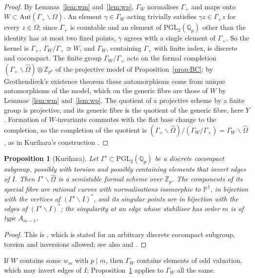 \documentclass[11pt]{amsart}
\theoremstyle{plain}
\newtheorem{proposition}[theorem]{Proposition}
\theoremstyle{remark}
\newcommand{\Z}{\mathbb{Z}}
\newcommand{\Qp}{\mathbb{Q}_p}
\newcommand{\Ohat}{\widehat{\Omega}}
\newcommand{\PGL}{\mathrm{PGL}}
\newcommand{\Aut}{\mathrm{Aut}}
\begin{document}
\begin{proof}
By Lemmas~\ref{lem:wm} and~\ref{lem:wp}, $\Gamma_W$ normalises $\Gamma_+$ and maps onto $W \subset \Aut(\Gamma_+\backslash\Omega)$. An element $\gamma \in \Gamma_W$ acting trivially satisfies $\gamma z \in \Gamma_+ z$ for every $z \in \Omega$; since $\Gamma_+$ is countable and an element of $\PGL_2(\Qp)$ other than the identity has at most two fixed points, $\gamma$ agrees with a single element of $\Gamma_+$. So the kernel is $\Gamma_+$, $\Gamma_W/\Gamma_+ \cong W$, and $\Gamma_W$, containing $\Gamma_+$ with finite index, is discrete and cocompact. The finite group $\Gamma_W/\Gamma_+$ acts on the formal completion $(\Gamma_+\backslash\Ohat) \otimes \Z_{p^2}$ of the projective model of Proposition~\ref{prop:BC}; by Grothendieck's existence theorem \cite[III, 5.4.1]{EGA} these automorphisms come from unique automorphisms of the model, which on the generic fibre are those of $W$ by Lemmas~\ref{lem:wm} and~\ref{lem:wp}. The quotient of a projective scheme by a finite group is projective, and its generic fibre is the quotient of the generic fibre, here $Y$. Formation of $W$-invariants commutes with the flat base change to the completion, so the completion of the quotient is $(\Gamma_+\backslash\Ohat)/(\Gamma_W/\Gamma_+) = \Gamma_W\backslash\Ohat$, as in Kurihara's construction \cite[p.~285]{Kur}.
\end{proof}

\begin{proposition}[Kurihara]\label{prop:kur}
Let $\Gamma' \subset \PGL_2(\Qp)$ be a discrete cocompact subgroup, possibly with torsion and possibly containing elements that invert edges of $I$. Then $\Gamma'\backslash\Ohat$ is a semistable formal scheme over $\Z_p$. The components of its special fibre are rational curves with normalisations isomorphic to $\mathbb{P}^1$, in bijection with the vertices of $(\Gamma'\backslash I)^*$, and its singular points are in bijection with the edges of $(\Gamma'\backslash I)^*$; the singularity at an edge whose stabiliser has order $m$ is of type $A_{m-1}$.
\end{proposition}

\begin{proof}
This is \cite[\S3, Propositions~3-2 and~3-4]{Kur}, which is stated for an arbitrary discrete cocompact subgroup, torsion and inversions allowed; see also \cite[III, 5.4.3]{BC} and \cite[Proposition~4.2]{JL}.
\end{proof}

If $W$ contains some $w_m$ with $p \mid m$, then $\Gamma_W$ contains elements of odd valuation, which may invert edges of $I$; Proposition~\ref{prop:kur} applies to $\Gamma_W$ all the same.
\end{document}
